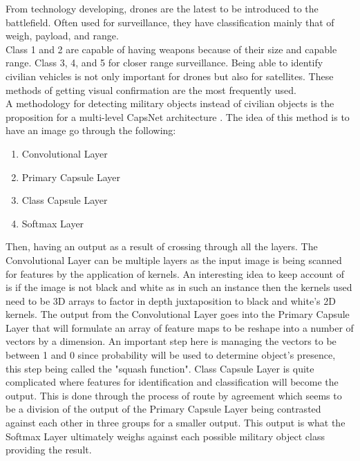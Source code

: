 \documentclass[12pt,twoside]{article}
\begin{document}
From technology developing, drones are the latest to be introduced to the battlefield. Often used for surveillance, they have classification mainly that of weigh, payload, and range.\\

Class 1 and 2 are capable of having weapons because of their size and capable range. Class 3, 4, and 5 for closer range surveillance. Being able to identify civilian vehicles is not only important for drones but also for satellites. These methods of getting visual confirmation are the most frequently used. \\


A methodology for detecting military objects instead of civilian objects is the proposition for a multi-level CapsNet architecture \cite{objectDetect}. The idea of this method is to have an image go through the following:
\begin{enumerate}
    \itemsep0em 
    \item Convolutional Layer
    \item Primary Capsule Layer
    \item Class Capsule Layer
    \item Softmax Layer
\end{enumerate}
Then, having an output as a result of crossing through all the layers. The Convolutional Layer can be multiple layers as the input image is being scanned for features by the application of kernels. An interesting idea to keep account of is if the image is not black and white as in such an instance then the kernels used need to be 3D arrays to factor in depth juxtaposition to black and white's 2D kernels. The output from the Convolutional Layer goes into the Primary Capsule Layer that will formulate an array of feature maps to be reshape into a number of vectors by a dimension. An important step here is managing the vectors to be between 1 and 0 since probability will be used to determine object's presence, this step being called the "squash function". Class Capsule Layer is quite complicated where features for identification and classification will become the output. This is done through the process of route by agreement which seems to be a division of the output of the Primary Capsule Layer being contrasted against each other in three groups for a smaller output. This output is what the Softmax Layer ultimately weighs against each possible military object class providing the result. \cite{objectDetect}
\end{document}
